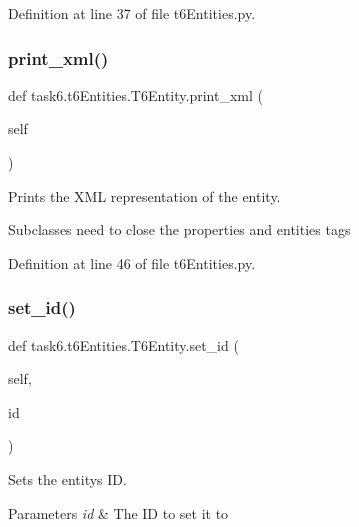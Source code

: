 Definition at line 37 of file t6\+Entities.\+py.

\mbox{\label{classtask6_1_1t6Entities_1_1T6Entity_aadc043ccba4eb2b57cb9ac365dc7dbfe}} 
\subsubsection{\texorpdfstring{print\+\_\+xml()}{print\_xml()}}
{\footnotesize\ttfamily def task6.\+t6\+Entities.\+T6\+Entity.\+print\+\_\+xml (\begin{DoxyParamCaption}\item[{}]{self }\end{DoxyParamCaption})}



Prints the X\+ML representation of the entity. 

Subclasses need to close the properties and entities tags 

Definition at line 46 of file t6\+Entities.\+py.

\mbox{\label{classtask6_1_1t6Entities_1_1T6Entity_aae04121cb00d82840741e39cf0da5706}} 
\subsubsection{\texorpdfstring{set\+\_\+id()}{set\_id()}}
{\footnotesize\ttfamily def task6.\+t6\+Entities.\+T6\+Entity.\+set\+\_\+id (\begin{DoxyParamCaption}\item[{}]{self,  }\item[{}]{id }\end{DoxyParamCaption})}



Sets the entity\textquotesingle{}s ID. 


\begin{DoxyParams}{Parameters}
{\em id} & The ID to set it to \\
\hline
\end{DoxyParams}


